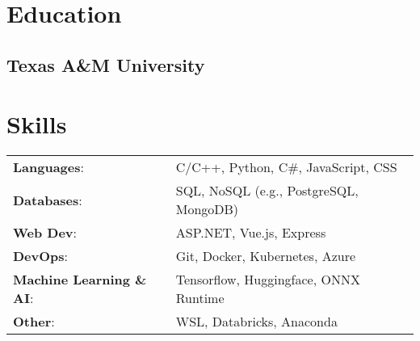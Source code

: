 \documentclass[]{resume-openfont}
\begin{document}
\begin{minipage}[t]{1\textwidth} 
\end{minipage}

\vspace{2.5 mm}

\begin{minipage}[t]{0.4\textwidth} 
    \section{\Large Education} 
    \subsection{Texas A\&M University}
\end{minipage}
\begin{minipage}[t]{0.6\textwidth}
    \section{\Large Skills}
        \vspace{-1.5 mm}
        \begin{tabular}{@{}l l}
            \textbf{Languages}: & C/C++, Python, C\#, JavaScript, CSS \\
            \textbf{Databases}: & SQL, NoSQL (e.g., PostgreSQL, MongoDB) \\
            \textbf{Web Dev}: & ASP.NET, Vue.js, Express \\
            \textbf{DevOps}: & Git, Docker, Kubernetes, Azure \\
            \textbf{Machine Learning \& AI}: & Tensorflow, Huggingface, ONNX Runtime \\
            \textbf{Other}: & WSL, Databricks, Anaconda \\
        \end{tabular}
\end{minipage}
\end{document}
